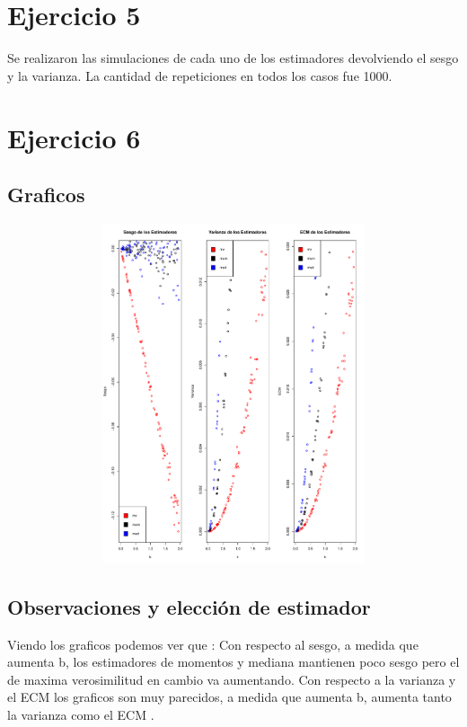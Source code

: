 \documentclass[a4paper]{article}
\begin{document}
\section{Ejercicio 5}
Se realizaron las simulaciones de cada uno de los estimadores devolviendo el sesgo y la varianza. La cantidad de repeticiones en todos los casos fue 1000.

\section{Ejercicio 6}
\subsection{Graficos}
\begin{figure}[H]
	\centering
	\includegraphics[width=15cm, height=10cm]{Ejercicio-6-plot}
\end{figure}

\subsection{Observaciones y elección de estimador}
Viendo los graficos podemos ver que : \newline
Con respecto al sesgo, a medida que aumenta b, los estimadores de momentos y mediana mantienen poco sesgo pero el de maxima verosimilitud en cambio va aumentando. \newline
Con respecto a la varianza y el ECM los graficos son muy parecidos, a medida que aumenta b, aumenta tanto la varianza como el ECM . \newline
\end{document}
